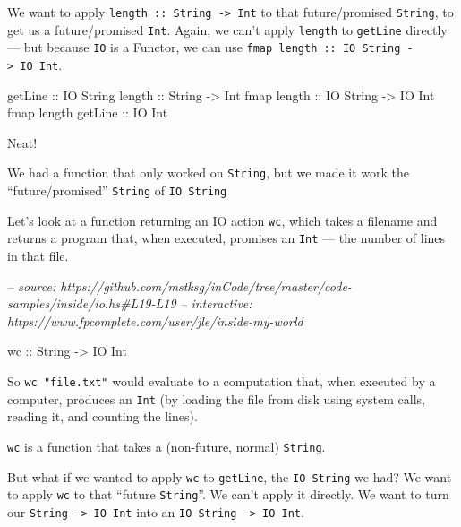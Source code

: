 \documentclass[]{article}
\newenvironment{Shaded}{}{}
\newcommand{\CommentTok}[1]{\textcolor[rgb]{0.38,0.63,0.69}{\textit{#1}}}
\newcommand{\DataTypeTok}[1]{\textcolor[rgb]{0.56,0.13,0.00}{#1}}
\newcommand{\NormalTok}[1]{#1}
\newcommand{\OtherTok}[1]{\textcolor[rgb]{0.00,0.44,0.13}{#1}}
\begin{document}
We want to apply \texttt{length\ ::\ String\ -\textgreater{}\ Int} to that
future/promised \texttt{String}, to get us a future/promised \texttt{Int}.
Again, we can't apply \texttt{length} to \texttt{getLine} directly --- but
because \texttt{IO} is a Functor, we can use
\texttt{fmap\ length\ ::\ IO\ String\ -\textgreater{}\ IO\ Int}.

\begin{Shaded}
\begin{Highlighting}[]
\NormalTok{getLine}\OtherTok{             ::} \DataTypeTok{IO} \DataTypeTok{String}
\NormalTok{length}\OtherTok{              ::} \DataTypeTok{String} \OtherTok{->} \DataTypeTok{Int}
\NormalTok{fmap}\OtherTok{ length         ::} \DataTypeTok{IO} \DataTypeTok{String} \OtherTok{->} \DataTypeTok{IO} \DataTypeTok{Int}
\NormalTok{fmap length}\OtherTok{ getLine ::} \DataTypeTok{IO} \DataTypeTok{Int}
\end{Highlighting}
\end{Shaded}

Neat!

We had a function that only worked on \texttt{String}, but we made it work the
``future/promised'' \texttt{String} of \texttt{IO\ String}

Let's look at a function returning an IO action \texttt{wc}, which takes a
filename and returns a program that, when executed, promises an \texttt{Int} ---
the number of lines in that file.

\begin{Shaded}
\begin{Highlighting}[]
\CommentTok{-- source: https://github.com/mstksg/inCode/tree/master/code-samples/inside/io.hs#L19-L19}
\CommentTok{-- interactive: https://www.fpcomplete.com/user/jle/inside-my-world}

\OtherTok{wc ::} \DataTypeTok{String} \OtherTok{->} \DataTypeTok{IO} \DataTypeTok{Int}
\end{Highlighting}
\end{Shaded}

So \texttt{wc\ "file.txt"} would evaluate to a computation that, when executed
by a computer, produces an \texttt{Int} (by loading the file from disk using
system calls, reading it, and counting the lines).

\texttt{wc} is a function that takes a (non-future, normal) \texttt{String}.

But what if we wanted to apply \texttt{wc} to \texttt{getLine}, the
\texttt{IO\ String} we had? We want to apply \texttt{wc} to that ``future
\texttt{String}''. We can't apply it directly. We want to turn our
\texttt{String\ -\textgreater{}\ IO\ Int} into an
\texttt{IO\ String\ -\textgreater{}\ IO\ Int}.
\end{document}
